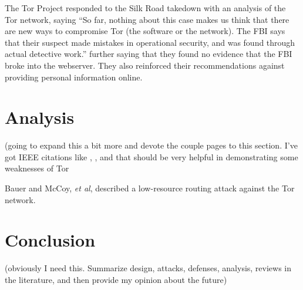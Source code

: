 \documentclass[journal]{IEEEtran}
\begin{document}
The Tor Project responded to the Silk Road takedown with an analysis of the Tor network, saying ``So far, nothing about this case makes us think that there are new ways to compromise Tor (the software or the network). The FBI says that their suspect made mistakes in operational security, and was found through actual detective work.'' further saying that they found no evidence that the FBI broke into the webserver. They also reinforced their recommendations against providing personal information online.\cite{TorBlogSilkRoad}

\section{Analysis}

(going to expand this a bit more and devote the couple pages to this section. I've got IEEE citations like \cite{Xin2009}, \cite{Ling2011}, and \cite{Ling2012} that should be very helpful in demonstrating some weaknesses of Tor

Bauer and McCoy, \textit{et al}, described a low-resource routing attack against the Tor network.\cite{Bauer2007}



\section{Conclusion}

(obviously I need this. Summarize design, attacks, defenses, analysis, reviews in the literature, and then provide my opinion about the future)

\end{document}
